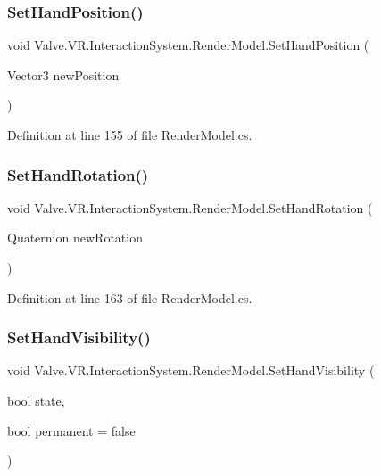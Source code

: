 \subsubsection{\texorpdfstring{SetHandPosition()}{SetHandPosition()}}
{\footnotesize\ttfamily void Valve.\+V\+R.\+Interaction\+System.\+Render\+Model.\+Set\+Hand\+Position (\begin{DoxyParamCaption}\item[{Vector3}]{new\+Position }\end{DoxyParamCaption})}



Definition at line 155 of file Render\+Model.\+cs.

\mbox{\label{class_valve_1_1_v_r_1_1_interaction_system_1_1_render_model_aea01b10d71171bad63b90e951034a8dc}} 
\subsubsection{\texorpdfstring{SetHandRotation()}{SetHandRotation()}}
{\footnotesize\ttfamily void Valve.\+V\+R.\+Interaction\+System.\+Render\+Model.\+Set\+Hand\+Rotation (\begin{DoxyParamCaption}\item[{Quaternion}]{new\+Rotation }\end{DoxyParamCaption})}



Definition at line 163 of file Render\+Model.\+cs.

\mbox{\label{class_valve_1_1_v_r_1_1_interaction_system_1_1_render_model_ae789148be24fed07f8b843a7aeb6c495}} 
\subsubsection{\texorpdfstring{SetHandVisibility()}{SetHandVisibility()}}
{\footnotesize\ttfamily void Valve.\+V\+R.\+Interaction\+System.\+Render\+Model.\+Set\+Hand\+Visibility (\begin{DoxyParamCaption}\item[{bool}]{state,  }\item[{bool}]{permanent = {\ttfamily false} }\end{DoxyParamCaption})}



